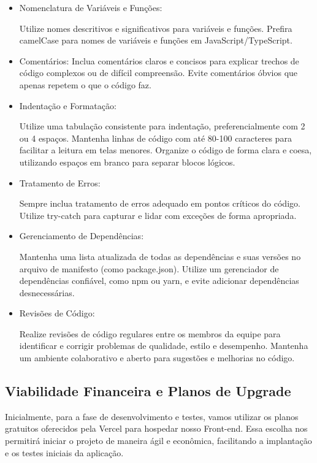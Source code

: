 \begin{itemize}
    \item Nomenclatura de Variáveis e Funções:

Utilize nomes descritivos e significativos para variáveis e funções.
Prefira camelCase para nomes de variáveis e funções em JavaScript/TypeScript.

    \item Comentários:
Inclua comentários claros e concisos para explicar trechos de código complexos ou de difícil compreensão.
Evite comentários óbvios que apenas repetem o que o código faz.

    \item Indentação e Formatação:

Utilize uma tabulação consistente para indentação, preferencialmente com 2 ou 4 espaços.
Mantenha linhas de código com até 80-100 caracteres para facilitar a leitura em telas menores.
Organize o código de forma clara e coesa, utilizando espaços em branco para separar blocos lógicos.

    \item Tratamento de Erros:

Sempre inclua tratamento de erros adequado em pontos críticos do código.
Utilize try-catch para capturar e lidar com exceções de forma apropriada.

    \item Gerenciamento de Dependências:

Mantenha uma lista atualizada de todas as dependências e suas versões no arquivo de manifesto (como package.json).
Utilize um gerenciador de dependências confiável, como npm ou yarn, e evite adicionar dependências desnecessárias.

    \item Revisões de Código:

Realize revisões de código regulares entre os membros da equipe para identificar e corrigir problemas de qualidade, estilo e desempenho.
Mantenha um ambiente colaborativo e aberto para sugestões e melhorias no código.

\end{itemize}

\newpage

\subsection{Viabilidade Financeira e Planos de Upgrade}

Inicialmente, para a fase de desenvolvimento e testes, vamos utilizar os planos gratuitos oferecidos pela Vercel para hospedar nosso Front-end. Essa escolha nos permitirá iniciar o projeto de maneira ágil e econômica, facilitando a implantação e os testes iniciais da aplicação.

